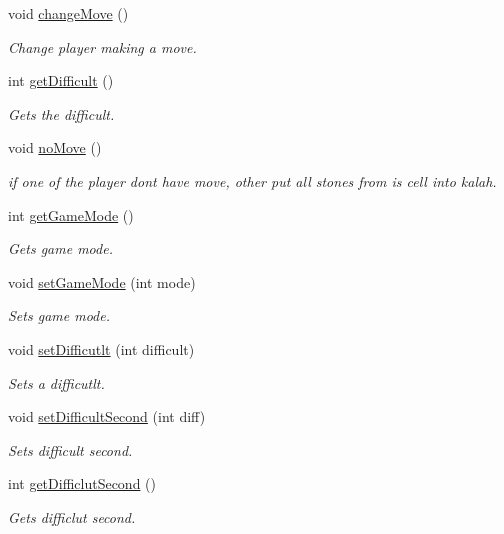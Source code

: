\begin{DoxyCompactItemize}
\item 
void \hyperlink{class_board_aad1d55272d0731a5ba89186d27bb233f}{change\+Move} ()
\begin{DoxyCompactList}\small\item\em Change player making a move. \end{DoxyCompactList}\item 
int \hyperlink{class_board_aef4768d46dfd2340ed85443943afb570}{get\+Difficult} ()
\begin{DoxyCompactList}\small\item\em Gets the difficult. \end{DoxyCompactList}\item 
void \hyperlink{class_board_a79d94f9cb1cb6ee0fc559a1f4bb64cee}{no\+Move} ()
\begin{DoxyCompactList}\small\item\em if one of the player dont have move, other put all stones from is cell into kalah. \end{DoxyCompactList}\item 
int \hyperlink{class_board_aa6ced20ecfbcd416e380f8b996e63377}{get\+Game\+Mode} ()
\begin{DoxyCompactList}\small\item\em Gets game mode. \end{DoxyCompactList}\item 
void \hyperlink{class_board_ae3e41080eb6992a95c5bc17ac3b39fdb}{set\+Game\+Mode} (int mode)
\begin{DoxyCompactList}\small\item\em Sets game mode. \end{DoxyCompactList}\item 
void \hyperlink{class_board_a1dce08c626976cf45b62042edd6feaed}{set\+Difficutlt} (int difficult)
\begin{DoxyCompactList}\small\item\em Sets a difficutlt. \end{DoxyCompactList}\item 
void \hyperlink{class_board_a4581c7df6b7571c3bdc1c3d8a4a717ee}{set\+Difficult\+Second} (int diff)
\begin{DoxyCompactList}\small\item\em Sets difficult second. \end{DoxyCompactList}\item 
int \hyperlink{class_board_a645b8a2c3952ee50daa94685014882f6}{get\+Difficlut\+Second} ()
\begin{DoxyCompactList}\small\item\em Gets difficlut second. \end{DoxyCompactList}\item 

\end{DoxyCompactItemize}
